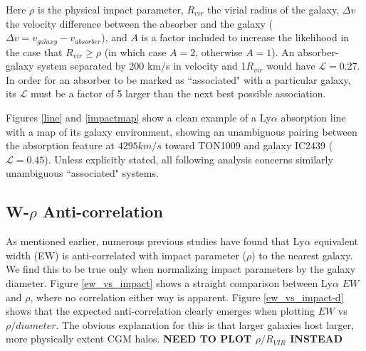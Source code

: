 \documentclass[iop]{emulateapj-rtx4}
\begin{document}
\noindent Here $\rho$ is the physical impact parameter, $R_{vir}$ the virial radius of the galaxy, $\Delta v$ the velocity difference between the absorber and the galaxy ($\Delta v = v_{galaxy} - v_{absorber}$), and $A$ is a factor included to increase the likelihood in the case that $R_{vir} \geq \rho$ (in which case $A = 2$, otherwise $A = 1$). An absorber-galaxy system separated by 200 km/s in velocity and 1$R_{vir}$ would have $\mathcal{L} = 0.27$. In order for an absorber to be marked as ``associated" with a particular galaxy, its $\mathcal{L}$ must be a factor of 5 larger than the next best possible association. 

Figures \ref{line} and \ref{impactmap} show a clean example of a Ly$\alpha$ absorption line with a map of its galaxy environment, showing an unambiguous pairing between the absorption feature at $4295km/s$ toward TON1009 and galaxy IC2439 ($\mathcal{L} = 0.45$). Unless explicitly stated, all following analysis concerns similarly unambiguous ``associated" systems.





\subsection{W-$\rho$ Anti-correlation}
As mentioned earlier, numerous previous studies have found that Ly$\alpha$ equivalent width (EW) is anti-correlated with impact parameter ($\rho$) to the nearest galaxy. We find this to be true only when normalizing impact parameters by the galaxy diameter. Figure \ref{ew_vs_impact} shows a straight comparison between Ly$\alpha$ $EW$ and $\rho$, where no correlation either way is apparent. Figure \ref{ew_vs_impact-d} shows that the expected anti-correlation clearly emerges when plotting $EW$ vs $\rho/diameter$. The obvious explanation for this is that larger galaxies host larger, more physically extent CGM halos. \textbf{NEED TO PLOT $\rho/R_{VIR}$ INSTEAD}
\end{document}
